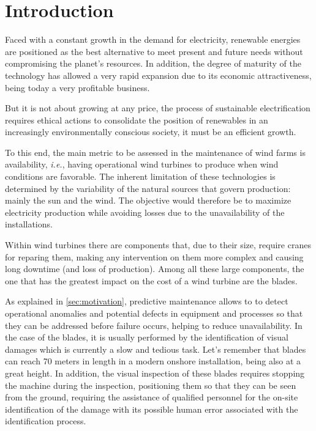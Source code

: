 \section{Introduction}
\label{sec:annexIntro}

Faced with a constant growth in the demand for electricity, renewable energies are positioned as the best alternative to meet present and future needs without compromising the planet's resources. In addition, the degree of maturity of the technology has allowed a very rapid expansion due to its economic attractiveness, being today a very profitable business.

But it is not about growing at any price, the process of sustainable electrification requires ethical actions to consolidate the position of renewables in an increasingly environmentally conscious society, it must be an efficient growth.

To this end, the main metric to be assessed in the maintenance of wind farms is availability, \emph{i.e.}, having operational wind turbines  to produce when wind conditions are favorable. The inherent limitation of these technologies is determined by the variability of the natural sources that govern production: mainly the sun and the wind. The objective would therefore be to maximize electricity production while avoiding losses due to the unavailability of the installations.

Within wind turbines there are components that, due to their size, require cranes for reparing them, making any intervention on them more complex and causing long downtime (and loss of production). Among all these large components, the one that has the greatest impact on the cost of a wind turbine are the blades.

As explained in \ref{sec:motivation}, predictive maintenance allows to  to detect operational anomalies and potential defects in equipment and processes so that they can be addressed before failure occurs, helping to reduce unavailability. In the case of the blades, it is usually performed by the identification of visual damages which is currently a slow and tedious task. Let's remember that blades can reach 70 meters in length in a modern onshore installation, being also at a great height. In addition, the visual inspection of these blades requires stopping the machine during the inspection, positioning them so that they can be seen from the ground, requiring the assistance of qualified personnel for the on-site identification of the damage with its possible human error associated with the identification process.

